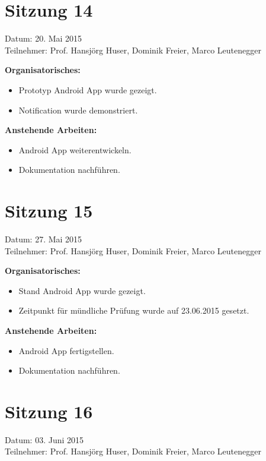 \section*{Sitzung 14}
	Datum: 20. Mai 2015 \\
	Teilnehmer: Prof. Hansjörg Huser, Dominik Freier, Marco Leutenegger

	\textbf{Organisatorisches:}
	\begin{itemize}
		\item Prototyp Android App wurde gezeigt.
		\item Notification wurde demonstriert.
	\end{itemize}

	\textbf{Anstehende Arbeiten:}
	\begin{itemize}
		\item Android App weiterentwickeln.
		\item Dokumentation nachführen.
	\end{itemize}

\section*{Sitzung 15}
	Datum: 27. Mai 2015 \\
	Teilnehmer: Prof. Hansjörg Huser, Dominik Freier, Marco Leutenegger

	\textbf{Organisatorisches:}
	\begin{itemize}
		\item Stand Android App wurde gezeigt.
		\item Zeitpunkt für mündliche Prüfung wurde auf 23.06.2015 gesetzt.
	\end{itemize}

	\textbf{Anstehende Arbeiten:}
	\begin{itemize}
		\item Android App fertigstellen.
		\item Dokumentation nachführen.
	\end{itemize}

\section*{Sitzung 16}
	Datum: 03. Juni 2015 \\
	Teilnehmer: Prof. Hansjörg Huser, Dominik Freier, Marco Leutenegger

